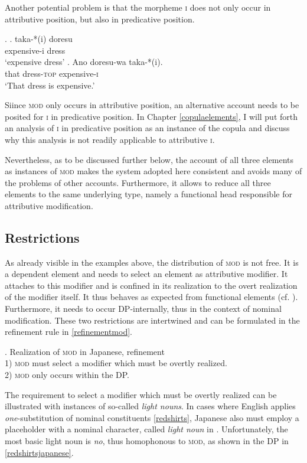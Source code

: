 \documentclass [output=book,colorlinks,citecolor=brown]{langscibook}
\begin{document}
Another potential problem is that the morpheme \textsc{i} does not only occur in attributive position, but also in predicative position.

\ex. \ag. taka-*(i) doresu\\
expensive-i dress\\
`expensive dress'
\bg. Ano doresu-wa taka-*(i).\\
that dress-\textsc{top} expensive-\textsc{i}\\
`That dress is expensive.'

Siince \textsc{mod} only occurs in attributive position, an alternative account needs to be posited for \textsc{i} in predicative position. In Chapter \ref{copulaelements}, I will put forth an analysis of \textsc{i} in predicative position as an instance of the copula \citep{nishiyama:1999:adj} and discuss why this analysis is not readily applicable to attributive \textsc{i}.

Nevertheless, as to be discussed further below, the account of all three elements as instances of \textsc{mod} makes the system adopted here consistent and avoids many of the problems of other accounts. Furthermore, it allows to reduce all three elements to the same underlying type, namely a functional head responsible for attributive modification.

\subsection{Restrictions}

As already visible in the examples above, the distribution of \textsc{mod} is not free. It is a dependent element and needs to select an element as attributive modifier. It attaches to this modifier and is confined in its realization to the overt realization of the modifier itself. It thus behaves as expected from functional elements (cf. \citealt[ch. 2.2.2]{rubin:1994:mod}). Furthermore, it needs to occur DP-internally, thus in the context of nominal modification. These two restrictions are intertwined and can be formulated in the refinement rule in \ref{refinementmod}. %

\ex. Realization of \textsc{mod} in Japanese, refinement\\
1) \textsc{mod} must select a modifier which must be overtly realized. \\
2) \textsc{mod} only occurs within the DP. \label{refinementmod}

The requirement to select a modifier which must be overtly realized can be illustrated with instances of so-called \textit{light nouns}. In cases where English applies \textit{one}-substitution of nominal constituents \ref{redshirts}, Japanese also must employ a placeholder with a nominal character, called \textit{light noun} in \citet{hiraiwa:2012:mechanism}. Unfortunately, the most basic light noun is \textit{no}, thus homophonous to \textsc{mod}, as shown in the DP in \ref{redshirtsjapanese}. %
\end{document}
